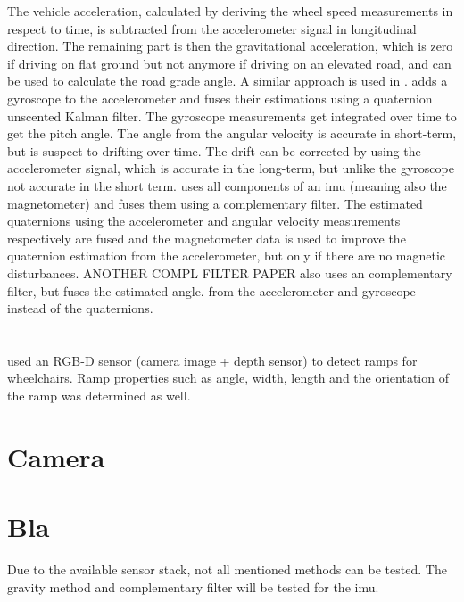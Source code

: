 The vehicle acceleration, calculated by deriving the wheel speed measurements in respect to time, is subtracted from the accelerometer signal in longitudinal direction.
The remaining part is then the gravitational acceleration, which is zero if driving on flat ground but not anymore if driving on an elevated road, and can be used to calculate the road grade angle.
A similar approach is used in \cite{Sentouh2008}.
\cite{He2020} adds a gyroscope to the accelerometer and fuses their estimations using a quaternion unscented Kalman filter.
The gyroscope measurements get integrated over time to get the pitch angle.
The angle from the angular velocity is accurate in short-term, but is suspect to drifting over time.
The drift can be corrected by using the accelerometer signal, which is accurate in the long-term, but unlike the gyroscope not accurate in the short term.
\cite{Wu2016} uses all components of an \gls{imu} (meaning also the magnetometer) and fuses them using a complementary filter.
The estimated quaternions using the accelerometer and angular velocity measurements respectively are fused and the magnetometer data is used to improve the quaternion estimation from the accelerometer, but only if there are no magnetic disturbances.
ANOTHER COMPL FILTER PAPER also uses an complementary filter, but fuses the estimated angle. from the accelerometer and gyroscope instead of the quaternions.



\section{}
\cite{Nejati2016} used an RGB-D sensor (camera image + depth sensor) to detect ramps for wheelchairs.
Ramp properties such as angle, width, length and the orientation of the ramp was determined as well.



\section{Camera}



\section{Bla}
Due to the available sensor stack, not all mentioned methods can be tested.
The gravity method and complementary filter will be tested for the \gls{imu}.

